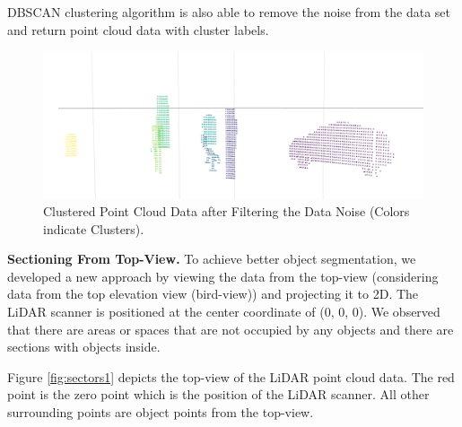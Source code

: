 DBSCAN clustering algorithm is also able to remove the noise from the data set and return point cloud data with cluster labels.


\begin{figure}[!h]
\begin{center}
  \includegraphics[width=.55\linewidth]{./images/seg_noise_removal.png}
  \caption{Clustered Point Cloud Data after Filtering the Data Noise (Colors indicate Clusters). }
  \label{fig:ClusteringWithNoiseFiltering}
\end{center}
\end{figure}



\textbf{Sectioning From Top-View.}
To achieve better object segmentation, we developed a new approach by viewing the data from the top-view (considering data from the top elevation view (bird-view)) and projecting it to 2D. The LiDAR scanner is positioned at the center coordinate
of (0, 0, 0).  We observed that there are areas or spaces that are not occupied by any
objects and there are sections with objects inside.

Figure \ref{fig:sectors1} depicts the top-view of the LiDAR point cloud data.
The red point is the zero point which is the position of the LiDAR scanner. 
All other surrounding points are object points from the top-view.

